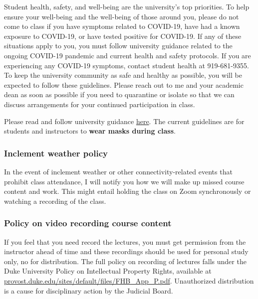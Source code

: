 \documentclass[
  letterpaper,
  DIV=11,
  numbers=noendperiod]{scrartcl}
\begin{document}
Student health, safety, and well-being are the university's top
priorities. To help ensure your well-being and the well-being of those
around you, please do not come to class if you have symptoms related to
COVID-19, have had a known exposure to COVID-19, or have tested positive
for COVID-19. If any of these situations apply to you, you must follow
university guidance related to the ongoing COVID-19 pandemic and current
health and safety protocols. If you are experiencing any COVID-19
symptoms, contact student health at 919-681-9355. To keep the university
community as safe and healthy as possible, you will be expected to
follow these guidelines. Please reach out to me and your academic dean
as soon as possible if you need to quarantine or isolate so that we can
discuss arrangements for your continued participation in class.

Please read and follow university guidance
\href{https://coronavirus.duke.edu/}{here}. The current guidelines are
for students and instructors to \textbf{wear masks during class}.

\hypertarget{inclement-weather-policy}{%
\subsubsection{Inclement weather
policy}\label{inclement-weather-policy}}

In the event of inclement weather or other connectivity-related events
that prohibit class attendance, I will notify you how we will make up
missed course content and work. This might entail holding the class on
Zoom synchronously or watching a recording of the class.

\hypertarget{policy-on-video-recording-course-content}{%
\subsubsection{Policy on video recording course
content}\label{policy-on-video-recording-course-content}}

If you feel that you need record the lectures, you must get permission
from the instructor ahead of time and these recordings should be used
for personal study only, no for distribution. The full policy on
recording of lectures falls under the Duke University Policy on
Intellectual Property Rights, available at
\href{https://provost.duke.edu/sites/default/files/FHB_App_P.pdf}{provost.duke.edu/sites/default/files/FHB\_App\_P.pdf}.
Unauthorized distribution is a cause for disciplinary action by the
Judicial Board.
\end{document}
